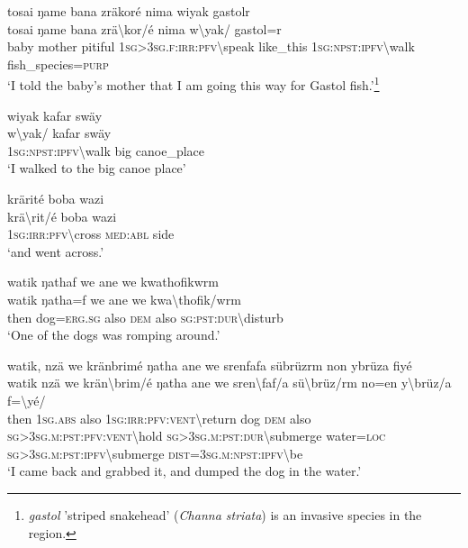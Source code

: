 \newpage
\ea\label{ex:13:a1273}
tosai ŋame bana zräkoré nima wiyak gastolr\\
\gll tosai	ŋame	bana	zrä{\textbackslash}kor/é	nima	w{\textbackslash}yak/	gastol=r\\
     baby	mother	pitiful	1\textsc{sg}>3\textsc{sg}.\textsc{f}:\textsc{irr}:\textsc{pfv}{\textbackslash}speak	like\_this	1\textsc{sg}:\textsc{npst}:\textsc{ipfv}{\textbackslash}walk	fish\_species=\textsc{purp}\\
\glt `I told the baby's mother that I am going this way for Gastol fish.'\footnote{\textit{gastol} 'striped snakehead' (\textit{Channa striata}) is an invasive species in the region.}
\z

\ea\label{ex:13:a1275}
wiyak kafar swäy\\
\gll w{\textbackslash}yak/	kafar	swäy\\
     1\textsc{sg}:\textsc{npst}:\textsc{ipfv}{\textbackslash}walk	big	canoe\_place\\
\glt `I walked to the big canoe place'
\z

\ea\label{ex:13:a1276}
krärité boba wazi\\
\gll krä{\textbackslash}rit/é	boba	wazi\\
     1\textsc{sg}:\textsc{irr}:\textsc{pfv}{\textbackslash}cross	\textsc{med}:\textsc{abl}	side\\
\glt `and went across.'
\z

\ea\label{ex:13:a1277}
watik ŋathaf we ane we kwathofikwrm\\
\gll watik	ŋatha=f	we	ane	we	kwa{\textbackslash}thofik/wrm\\
     then	dog=\textsc{erg}.\textsc{sg}	also	\textsc{dem}	also	\textsc{sg}:\textsc{pst}:\textsc{dur}{\textbackslash}disturb\\
\glt `One of the dogs was romping around.'
\z

\ea\label{ex:13:a1278}
watik, nzä we kränbrimé ŋatha ane we srenfafa sübrüzrm non ybrüza fiyé\\
\gll watik	nzä	we	krän{\textbackslash}brim/é	ŋatha	ane	we	sren{\textbackslash}faf/a	sü{\textbackslash}brüz/rm	no=en	y{\textbackslash}brüz/a	f={\textbackslash}yé/\\
     then	1\textsc{sg}.\textsc{abs}	also	1\textsc{sg}:\textsc{irr}:\textsc{pfv}:\textsc{vent}{\textbackslash}return	dog	\textsc{dem}	also	\textsc{sg}>3\textsc{sg}.\textsc{m}:\textsc{pst}:\textsc{pfv}:\textsc{vent}{\textbackslash}hold	\textsc{sg}>3\textsc{sg}.\textsc{m}:\textsc{pst}:\textsc{dur}{\textbackslash}submerge	water=\textsc{loc}	\textsc{sg}>3\textsc{sg}.\textsc{m}:\textsc{pst}:\textsc{ipfv}{\textbackslash}submerge	\textsc{dist}=3\textsc{sg}.\textsc{m}:\textsc{npst}:\textsc{ipfv}{\textbackslash}be\\
\glt `I came back and grabbed it, and dumped the dog in the water.'
\z

